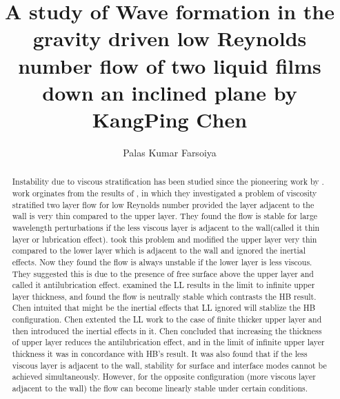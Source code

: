 \documentclass[11pt,a4paper]{article}
\begin{document}
\title{A study of Wave formation in the gravity driven low Reynolds number flow of two liquid films down an inclined plane by KangPing Chen}
\author{Palas Kumar Farsoiya}

\date{\vspace{-5ex}}

\maketitle


\begin{abstract}
Instability due to viscous stratification has been studied since the pioneering work by \cite{Yih1967}. \cite{Chen1993} work orginates from the results of 
 \cite{HB1987}, in which they investigated a problem of viscosity stratified two layer flow for low Reynolds number provided the layer 
adjacent to the wall is very thin compared to the upper layer. They found the flow is stable for large wavelength perturbations if 
the less viscous layer is adjacent to the wall(called it thin layer or lubrication effect). \cite{LL1989} took this problem and modified the
upper layer very thin compared to the lower layer which is adjacent to the wall and ignored the inertial effects. Now they found the flow is always unstable 
if the lower layer is less viscous. They suggested this is due to the presence of free surface above the upper layer and called it antilubrication effect.
\cite{Chen1993} examined the LL results in the limit to infinite upper layer thickness, and found the flow is neutrally stable which contrasts the HB result.
Chen intuited that might be the inertial effects that LL ignored will stablize the HB configuration. Chen extented the LL work to the case of finite thicker 
upper layer and then introduced the inertial effects in it. Chen concluded that increasing the thickness of upper layer reduces the antilubrication effect, and in
the limit of infinite upper layer thickness it was in concordance with HB's result. It was also found that if the less viscous layer is adjacent to the wall,
stability for surface and interface modes cannot be achieved simultaneously. However, for the opposite configuration (more viscous layer adjacent to the wall)
the flow can become linearly stable under certain conditions.
\end{abstract}
\pagebreak


\end{document}
